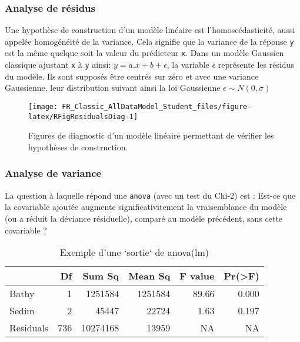 \documentclass[french,a4paper]{article}
\begin{document}
\hypertarget{analyse-de-residus}{%
\subsubsection{Analyse de résidus}\label{analyse-de-residus}}

Une hypothèse de construction d'un modèle linéaire est l'homoscédasticité, aussi appelée homogénéité de la variance. Cela signifie que la variance de la réponse \texttt{y} est la même quelque soit la valeur du prédicteur \texttt{x}. Dans un modèle Gaussien classique ajustant \texttt{x} à \texttt{y} ainsi: \(y = a.x + b + \epsilon\), la variable \(\epsilon\) représente les résidus du modèle. Ils sont supposés être centrés sur zéro et avec une variance Gaussienne, leur distribution suivant ainsi la loi Gaussienne \(\epsilon \sim N(0, \sigma)\)



\begin{figure}[!h]

{\centering \texttt{[image: FR\_Classic\_AllDataModel\_Student\_files/figure-latex/RFigResidualsDiag-1]} 

}

\caption{Figures de diagnostic d'un modèle linéaire permettant de vérifier les hypothèses de construction.}\label{fig:RFigResidualsDiag}
\end{figure}

\hypertarget{analyse-de-variance}{%
\subsubsection{Analyse de variance}\label{analyse-de-variance}}

La question à laquelle répond une \texttt{anova} (avec un test du Chi-2) est : Est-ce que la covariable ajoutée augmente significativitement la vraisemblance du modèle (ou a réduit la déviance résiduelle), comparé au modèle précédent, sans cette covariable ?

\begin{table}[t]

\caption{\label{tab:RTableAnova}Exemple d'une `sortie` de anova(lm)}
\centering
\begin{tabular}{l|r|r|r|r|r}
\hline
  & Df & Sum Sq & Mean Sq & F value & Pr(>F)\\
\hline
Bathy & 1 & 1251584 & 1251584 & 89.66 & 0.000\\
\hline
Sedim & 2 & 45447 & 22724 & 1.63 & 0.197\\
\hline
Residuals & 736 & 10274168 & 13959 & NA & NA\\
\hline
\end{tabular}
\end{table}
\end{document}
